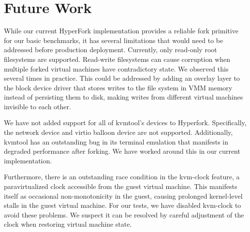 \section{Future Work} \label{sec:future}

 While our current HyperFork implementation provides a
reliable fork primitive for our basic benchmarks, it has several limitations
that would need to be addressed before production deployment. Currently, only
read-only root filesystems are supported. Read-write filesystems can cause
corruption when multiple forked virtual machines have contradictory state. We
observed this several times in practice. This could be addressed by adding an
overlay layer to the block device driver that stores writes to the file system
in VMM memory instead of persisting them to disk, making writes from different
virtual machines invisible to each other.

We have not added support for all of kvmtool's devices to Hyperfork.
Specifically, the network device and virtio balloon device are not
supported. Additionally, kvmtool has an outstanding bug in its terminal
emulation that manifests in degraded performance after forking. We have worked
around this in our current implementation.

Furthermore, there is an outstanding race condition in the kvm-clock feature, a
paravirtualized clock accessible from the guest virtual machine. This manifests
itself as occasional non-monotonicity in the guest, causing prolonged
kernel-level stalls in the guest virtual machine. For our tests, we have
disabled kvm-clock to avoid these problems. We suspect it can be resolved by
careful adjustment of the clock when restoring virtual machine state.


